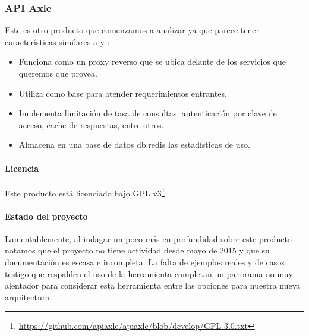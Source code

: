 \subsubsection{API Axle}
\label{soa:tecnologias:api-axle}

Este es otro producto que comenzamos a analizar ya que parece tener características similares a  y :

\begin{itemize}
  \item Funciona como un proxy reverso que se ubica delante de los servicios que queremos que provea.
  \item Utiliza  como base para atender requerimientos entrantes.
  \item Implementa limitación de tasa de consultas, autenticación por clave de acceso, cache de respuestas, entre otros.
  \item Almacena en una base de datos \gls{db:redis} las estadísticas de uso.
\end{itemize}

\paragraph{Licencia}

Este producto está licenciado bajo GPL v3\footnote{\url{https://github.com/apiaxle/apiaxle/blob/develop/GPL-3.0.txt}}.

\paragraph{Estado del proyecto}

Lamentablemente, al indagar un poco más en profundidad sobre este producto notamos que el proyecto no tiene actividad desde mayo de 2015 y que su documentación es escasa e incompleta. La falta de ejemplos reales y de casos testigo que respalden el uso de la herramienta completan un panorama no muy alentador para considerar esta herramienta entre las opciones para nuestra nueva arquitectura.
